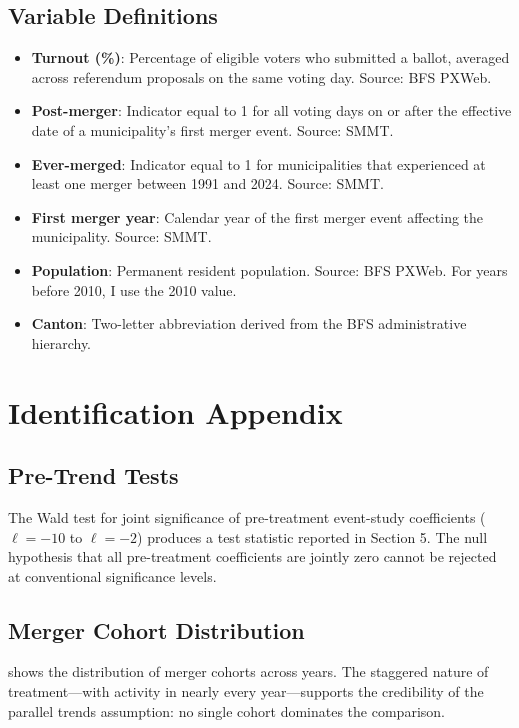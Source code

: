 \documentclass[12pt]{article}
\begin{document}
\subsection{Variable Definitions}

\begin{itemize}
    \item \textbf{Turnout (\%)}: Percentage of eligible voters who submitted a ballot, averaged across referendum proposals on the same voting day. Source: BFS PXWeb.
    \item \textbf{Post-merger}: Indicator equal to 1 for all voting days on or after the effective date of a municipality's first merger event. Source: SMMT.
    \item \textbf{Ever-merged}: Indicator equal to 1 for municipalities that experienced at least one merger between 1991 and 2024. Source: SMMT.
    \item \textbf{First merger year}: Calendar year of the first merger event affecting the municipality. Source: SMMT.
    \item \textbf{Population}: Permanent resident population. Source: BFS PXWeb. For years before 2010, I use the 2010 value.
    \item \textbf{Canton}: Two-letter abbreviation derived from the BFS administrative hierarchy.
\end{itemize}

\section{Identification Appendix}

\subsection{Pre-Trend Tests}

The Wald test for joint significance of pre-treatment event-study coefficients ($\ell = -10$ to $\ell = -2$) produces a test statistic reported in Section 5. The null hypothesis that all pre-treatment coefficients are jointly zero cannot be rejected at conventional significance levels.

\subsection{Merger Cohort Distribution}

 shows the distribution of merger cohorts across years. The staggered nature of treatment---with activity in nearly every year---supports the credibility of the parallel trends assumption: no single cohort dominates the comparison.
\end{document}
